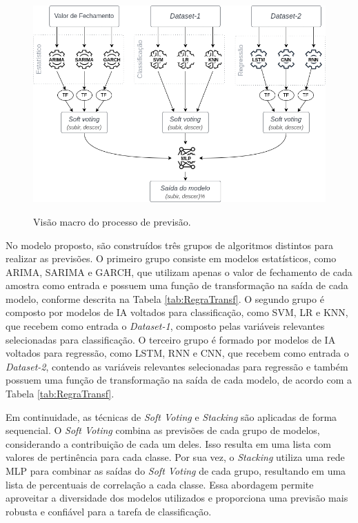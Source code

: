 \begin{figure}[htbp]
    \caption{Visão macro do processo de previsão.}
      \centering
    \includegraphics[width=.99\linewidth]{sections/images/model_prediction.png} 
    \label{fig:model_prediction}
\end{figure}

No modelo proposto, são construídos três grupos de algoritmos distintos para realizar as previsões. O primeiro grupo consiste em modelos estatísticos, como \ac{ARIMA}, \ac{SARIMA} e \ac{GARCH}, que utilizam apenas o valor de fechamento de cada amostra como entrada e possuem uma função de transformação na saída de cada modelo, conforme descrita na Tabela \ref{tab:RegraTransf}. O segundo grupo é composto por modelos de \ac{IA} voltados para classificação, como \ac{SVM}, \ac{LR} e \ac{KNN}, que recebem como entrada o \textit{Dataset-1}, composto pelas variáveis relevantes selecionadas para classificação. O terceiro grupo é formado por modelos de \ac{IA} voltados para regressão, como \ac{LSTM}, \ac{RNN} e \ac{CNN}, que recebem como entrada o \textit{Dataset-2}, contendo as variáveis relevantes selecionadas para regressão e também possuem uma função de transformação na saída de cada modelo, de acordo com a Tabela \ref{tab:RegraTransf}. 

Em continuidade, as técnicas de \textit{Soft Voting} e \textit{Stacking} são aplicadas de forma sequencial. O \textit{Soft Voting} combina as previsões de cada grupo de modelos, considerando a contribuição de cada um deles. Isso resulta em uma lista com valores de pertinência para cada classe. Por sua vez, o \textit{Stacking} utiliza uma rede MLP para combinar as saídas do \textit{Soft Voting} de cada grupo, resultando em uma lista de percentuais de correlação a cada classe. Essa abordagem permite aproveitar a diversidade dos modelos utilizados e proporciona uma previsão mais robusta e confiável para a tarefa de classificação.

